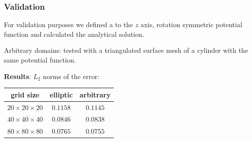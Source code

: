 \documentclass[xcolor=pdftex,table,10pt]{beamer}
\begin{document}
     	\begin{frame}
		\frametitle{Validation}

		For validation purposes we defined a to the $z$ axis, rotation symmetric potential function and calculated the analytical solution.

		\vspace{0.5cm}

		Arbitrary domains: tested with a triangulated surface mesh of a cylinder with the same potential function.

		\vspace{0.7cm}
		\pause

		\textbf{Results}: $L_2$ norms of the error:
		\begin{center}
			\begin{tabular}{|c|c|c|}
			\hline
			grid size & elliptic & arbitrary \\
			\hline
			$20 \times 20 \times 20$ & $0.1158$ & $0.1145$ \\
			$40 \times 40 \times 40$ & $0.0846$ & $0.0838$ \\
			$80 \times 80 \times 80$ & $0.0765$ & $0.0755$ \\
			\hline
        		\end{tabular}
		\end{center}

	\end{frame}


\end{document}
